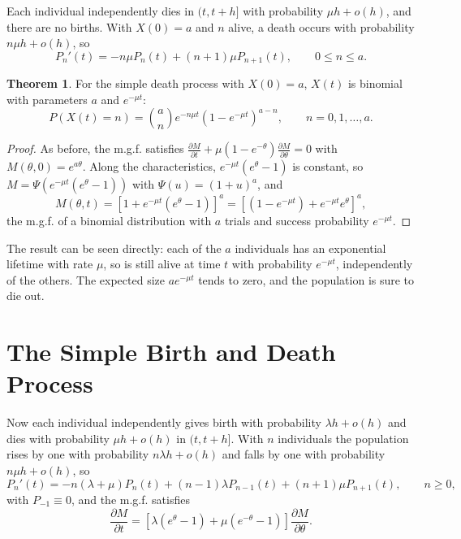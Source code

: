 \documentclass[12pt,a4paper]{report}
\theoremstyle{definition}
\newtheorem{thm}{Theorem}[section]
\begin{document}
Each individual independently dies in $(t, t + h]$ with probability $\mu h + o(h)$, and there are no
births. With $X(0) = a$ and $n$ alive, a death occurs with probability $n\mu h + o(h)$, so
\begin{equation}
\label{eq:deathde}
P_n'(t) = -n\mu P_n(t) + (n + 1)\mu P_{n+1}(t),\qquad 0\leq n\leq a .
\end{equation}

\begin{thm}
\label{thm:death}
For the simple death process with $X(0) = a$, $X(t)$ is binomial with parameters $a$ and $e^{-\mu t}$:
\[P(X(t) = n) = \binom an e^{-n\mu t}\left(1 - e^{-\mu t}\right)^{a - n},\qquad n = 0, 1, \dots, a .\]
\end{thm}

\begin{proof}
As before, the m.g.f. satisfies $\frac{\partial M}{\partial t} + \mu(1 - e^{-\theta})\frac{\partial M}{\partial\theta} = 0$ with
$M(\theta, 0) = e^{a\theta}$. Along the characteristics, $e^{-\mu t}(e^\theta - 1)$ is constant, so
$M = \Psi\left(e^{-\mu t}(e^\theta - 1)\right)$ with $\Psi(u) = (1 + u)^a$, and
\[M(\theta, t) = \left[1 + e^{-\mu t}(e^\theta - 1)\right]^a = \left[(1 - e^{-\mu t}) + e^{-\mu t}e^\theta\right]^a,\]
the m.g.f. of a binomial distribution with $a$ trials and success probability $e^{-\mu t}$.
\end{proof}

The result can be seen directly: each of the $a$ individuals has an exponential lifetime with rate
$\mu$, so is still alive at time $t$ with probability $e^{-\mu t}$, independently of the others. The
expected size $ae^{-\mu t}$ tends to zero, and the population is sure to die out.

\section{The Simple Birth and Death Process}

Now each individual independently gives birth with probability $\lambda h + o(h)$ and dies with
probability $\mu h + o(h)$ in $(t, t + h]$. With $n$ individuals the population rises by one with
probability $n\lambda h + o(h)$ and falls by one with probability $n\mu h + o(h)$, so
\[P_n'(t) = -n(\lambda + \mu)P_n(t) + (n - 1)\lambda P_{n-1}(t) + (n + 1)\mu P_{n+1}(t),\qquad n\geq 0,\]
with $P_{-1}\equiv 0$, and the m.g.f. satisfies
\[\frac{\partial M}{\partial t} = \left[\lambda(e^\theta - 1) + \mu(e^{-\theta} - 1)\right]\frac{\partial M}{\partial\theta} .\]
\end{document}
